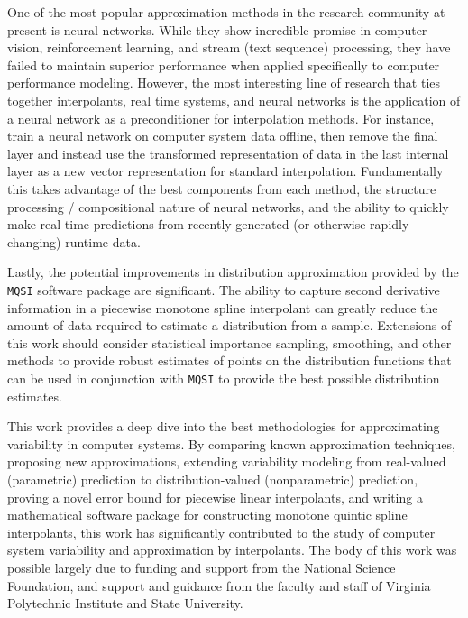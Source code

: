 One of the most popular approximation methods in the research community at present is neural networks. While they show incredible promise in computer vision, reinforcement learning, and stream (text sequence) processing, they have failed to maintain superior performance when applied specifically to computer performance modeling. However, the most interesting line of research that ties together interpolants, real time systems, and neural networks is the application of a neural network as a preconditioner for interpolation methods. For instance, train a neural network on computer system data offline, then remove the final layer and instead use the transformed representation of data in the last internal layer as a new vector representation for standard interpolation. Fundamentally this takes advantage of the best components from each method, the structure processing / compositional nature of neural networks, and the ability to quickly make real time predictions from recently generated (or otherwise rapidly changing) runtime data.

Lastly, the potential improvements in distribution approximation provided by the \texttt{MQSI} software package are significant. The ability to capture second derivative information in a piecewise monotone spline interpolant can greatly reduce the amount of data required to estimate a distribution from a sample. Extensions of this work should consider statistical importance sampling, smoothing, and other methods to provide robust estimates of points on the distribution functions that can be used in conjunction with \texttt{MQSI} to provide the best possible distribution estimates.

This work provides a deep dive into the best methodologies for approximating variability in computer systems. By comparing known approximation techniques, proposing new approximations, extending variability modeling from real-valued (parametric) prediction to distribution-valued (nonparametric) prediction, proving a novel error bound for piecewise linear interpolants, and writing a mathematical software package for constructing monotone quintic spline interpolants, this work has significantly contributed to the study of computer system variability and approximation by interpolants. The body of this work was possible largely due to funding and support from the National Science Foundation, and support and guidance from the faculty and staff of Virginia Polytechnic Institute and State University.

